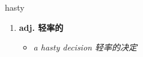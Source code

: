 
\begin{frame}
{\huge hasty}
\begin{center}
\begin{enumerate}\Large
  \item \textbf{adj. 轻率的}
  \begin{itemize}
    \item \em{\Large{a hasty decision 轻率的决定}}
  \end{itemize}
\end{enumerate}
\end{center}
\end{frame}
